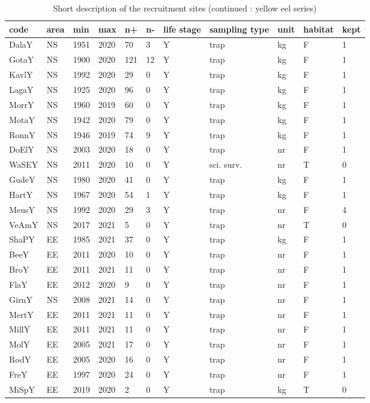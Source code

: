\begin{table}[htbp]
\centering
\caption{Short description of the recruitment sites (continued : yellow eel series) } 
\label{statseriesY}
\begin{tabular}{p{1cm}p{1cm}p{1cm}p{1cm}p{0.8cm}p{0.8cm}p{1cm}p{2cm}p{2cm}p{1cm}p{1cm}}
  \hline
code & area & min & max & n+ & n- & life stage & sampling type & unit & habitat & kept \\ 
  \hline
DalaY & NS & 1951 & 2020 & 70 & 3 & Y & trap & kg & F & 1 \\ 
  GotaY & NS & 1900 & 2020 & 121 & 12 & Y & trap & kg & F & 1 \\ 
  KavlY & NS & 1992 & 2020 & 29 & 0 & Y & trap & kg & F & 1 \\ 
  LagaY & NS & 1925 & 2020 & 96 & 0 & Y & trap & kg & F & 1 \\ 
  MorrY & NS & 1960 & 2019 & 60 & 0 & Y & trap & kg & F & 1 \\ 
  MotaY & NS & 1942 & 2020 & 79 & 0 & Y & trap & kg & F & 1 \\ 
  RonnY & NS & 1946 & 2019 & 74 & 9 & Y & trap & kg & F & 1 \\ 
  DoElY & NS & 2003 & 2020 & 18 & 0 & Y & trap & nr & F & 1 \\ 
  WaSEY & NS & 2011 & 2020 & 10 & 0 & Y & sci. surv. & nr & T & 0 \\ 
  GudeY & NS & 1980 & 2020 & 41 & 0 & Y & trap & kg & F & 1 \\ 
  HartY & NS & 1967 & 2020 & 54 & 1 & Y & trap & kg & F & 1 \\ 
  MeusY & NS & 1992 & 2020 & 29 & 3 & Y & trap & nr & F & 4 \\ 
  VeAmY & NS & 2017 & 2021 & 5 & 0 & Y & trap & nr & T & 0 \\ 
  ShaPY & EE & 1985 & 2021 & 37 & 0 & Y & trap & kg & F & 1 \\ 
  BeeY & EE & 2011 & 2020 & 10 & 0 & Y & trap & nr & F & 1 \\ 
  BroY & EE & 2011 & 2021 & 11 & 0 & Y & trap & nr & F & 1 \\ 
  FlaY & EE & 2012 & 2020 & 9 & 0 & Y & trap & nr & F & 1 \\ 
  GirnY & NS & 2008 & 2021 & 14 & 0 & Y & trap & nr & F & 1 \\ 
  MertY & EE & 2011 & 2021 & 11 & 0 & Y & trap & nr & F & 1 \\ 
  MillY & EE & 2011 & 2021 & 11 & 0 & Y & trap & nr & F & 1 \\ 
  MolY & EE & 2005 & 2021 & 17 & 0 & Y & trap & nr & F & 1 \\ 
  RodY & EE & 2005 & 2020 & 16 & 0 & Y & trap & nr & F & 1 \\ 
  FreY & EE & 1997 & 2020 & 24 & 0 & Y & trap & nr & F & 1 \\ 
  MiSpY & EE & 2019 & 2020 & 2 & 0 & Y & trap & kg & T & 0 \\ 
   \hline
\end{tabular}
\end{table}
